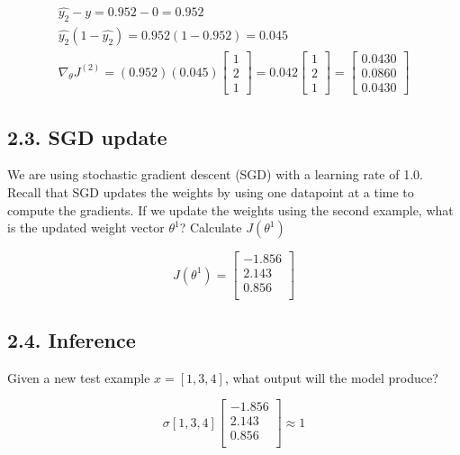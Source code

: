 \documentclass[11pt]{article}
\theoremstyle{plain}
\begin{document}
\[
	\begin{gathered}
		\\ \hat{y_2} - y = 0.952-0 = 0.952
		\\ \hat{y_2} (1-\hat{y_2}) = 0.952(1-0.952) = 0.045
		\\ \nabla_{\theta}J^{(2)} = (0.952)(0.045)
		\begin{bmatrix} 1 \\ 2 \\ 1
		\end{bmatrix} = 0.042
		\begin{bmatrix} 1 \\ 2 \\ 1
		\end{bmatrix} =
		\begin{bmatrix}
			0.0430 \\
			0.0860 \\
			0.0430
		\end{bmatrix}
	\end{gathered}
\]

\subsection*{2.3. SGD update }
We are using stochastic gradient descent (SGD) with a learning rate of 1.0.  Recall that SGD updates the weights by using one datapoint at a time to compute the gradients.  If we update the weights using the second example, what is the updated weight vector $\theta^{1}$? Calculate $J(\theta^{1})$

\[
	J(\theta^{1}) =
	\begin{bmatrix}
		-1.856 \\
		2.143  \\
		0.856  \\
	\end{bmatrix}
\]

\subsection*{2.4. Inference }
Given a new test example $x=[1,3,4]$, what output will the model produce?

\[
    \sigma
    [1,3,4]
	\begin{bmatrix}
		-1.856 \\
		2.143  \\
		0.856  \\
	\end{bmatrix} \approx 1
\]
\end{document}
